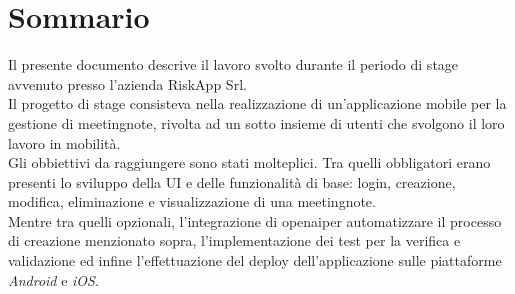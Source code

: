 \cleardoublepage
{}
{}
\begingroup
\let\clearpage\relax
\let\cleardoublepage\relax
\let\cleardoublepage\relax

\chapter*{Sommario}

Il presente documento descrive il lavoro svolto durante il periodo di stage avvenuto presso l'azienda RiskApp Srl. \\

\noindent Il progetto di stage consisteva nella realizzazione di un'applicazione mobile per la gestione di \gls{meetingnote}\glsoccur, rivolta ad un sotto insieme di utenti che svolgono il loro lavoro in mobilità. \\


\noindent Gli obbiettivi da raggiungere sono stati molteplici. Tra quelli obbligatori erano presenti lo sviluppo della UI e delle funzionalità di base: login, creazione, modifica, eliminazione e visualizzazione di una \gls{meetingnote}\glsoccur.\\
Mentre tra quelli opzionali, l'integrazione di \gls{openai}\glsoccur per automatizzare il processo di creazione menzionato sopra, l'implementazione dei test per la verifica e validazione ed infine l'effettuazione del deploy dell'applicazione sulle piattaforme \emph{Android} e \emph{iOS}.\\




\endgroup

\vfill
